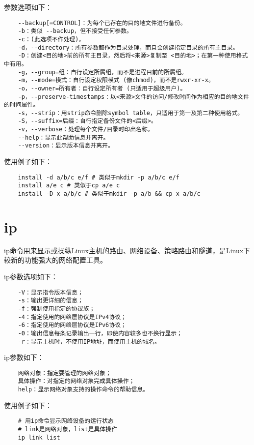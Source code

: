 \documentclass[a4paper,left=2.5cm,right=2.5cm,11pt]{article}
\begin{document}
	参数选项如下：
	\begin{lstlisting}
	--backup[=CONTROL]：为每个已存在的目的地文件进行备份。 
	-b：类似 --backup，但不接受任何参数。 
	-c：(此选项不作处理)。 
	-d，--directory：所有参数都作为目录处理，而且会创建指定目录的所有主目录。 
	-D：创建<目的地>前的所有主目录，然后将<来源>复制至 <目的地>；在第一种使用格式中有用。 
	-g，--group=组：自行设定所属组，而不是进程目前的所属组。 
	-m，--mode=模式：自行设定权限模式 (像chmod)，而不是rwxr-xr-x。 
	-o，--owner=所有者：自行设定所有者 (只适用于超级用户)。 
	-p，--preserve-timestamps：以<来源>文件的访问/修改时间作为相应的目的地文件的时间属性。 
	-s，--strip：用strip命令删除symbol table，只适用于第一及第二种使用格式。 
	-S，--suffix=后缀：自行指定备份文件的<后缀>。 
	-v，--verbose：处理每个文件/目录时印出名称。 
	--help：显示此帮助信息并离开。 
	--version：显示版本信息并离开。
	\end{lstlisting}

	使用例子如下：
	\begin{lstlisting}
	install -d a/b/c e/f # 类似于mkdir -p a/b/c e/f
	install a/e c # 类似于cp a/e c
	install -D x a/b/c # 类似于mkdir -p a/b && cp x a/b/c
	\end{lstlisting}

\section{ip}
	ip命令用来显示或操纵Linux主机的路由、网络设备、策略路由和隧道，是Linux下较新的功能强大的网络配置工具。\par

	ip参数选项如下：
	\begin{lstlisting}
	-V：显示指令版本信息； 
	-s：输出更详细的信息； 
	-f：强制使用指定的协议族； 
	-4：指定使用的网络层协议是IPv4协议； 
	-6：指定使用的网络层协议是IPv6协议； 
	-0：输出信息每条记录输出一行，即使内容较多也不换行显示； 
	-r：显示主机时，不使用IP地址，而使用主机的域名。
	\end{lstlisting}

	ip参数如下：
	\begin{lstlisting}
	网络对象：指定要管理的网络对象； 
	具体操作：对指定的网络对象完成具体操作； 
	help：显示网络对象支持的操作命令的帮助信息。
	\end{lstlisting}

	使用例子如下：
	\begin{lstlisting}
	# 用ip命令显示网络设备的运行状态
	# link是网络对象，list是具体操作
	ip link list
	\end{lstlisting}
\end{document}
